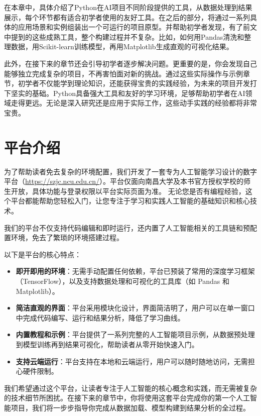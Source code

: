 在本章中，具体介绍了Python在AI项目不同阶段提供的工具，从数据处理到结果展示，每个环节都有适合初学者使用的友好工具。在之后的部分，将通过一系列具体的应用场景和实例组装出一个可运行的项目原型。并帮助初学者发现，有了前文中提到的这些成熟工具，整个构建过程并不复杂。比如，如何用Pandas清洗和整理数据，用Scikit-learn训练模型，再用Matplotlib生成直观的可视化结果。

此外，在接下来的章节还会引导初学者逐步解决问题。更重要的是，你会发现自己能够独立完成复杂的项目，不再害怕面对新的挑战。通过这些实际操作与示例章节，初学者不仅能学到理论知识，还能获得宝贵的实践经验，为未来的项目开发打下坚实的基础。Python具备强大工具和友好的学习环境，足够帮助初学者在AI领域走得更远。无论是深入研究还是应用于实际工作，这些动手实践的经验都将非常宝贵。

\section{平台介绍}
为了帮助读者免去复杂的环境配置，我们开发了一套专为人工智能学习设计的数字平台（\href{https://szjc.ncu.edu.cn/}{https://szjc.ncu.edu.cn/}）。平台仅面向南昌大学及本书官方授权学校的师生开放，具体功能与登录权限以平台实际页面为准。
无论您是否有编程经验，这个平台都能帮助您轻松入门，让您专注于学习和实践人工智能的基础知识和核心技术。

我们的平台不仅支持代码编辑和即时运行，还内置了人工智能相关的工具链和预配置环境，免去了繁琐的环境搭建过程。

以下是平台的核心特点：
\begin{itemize}
    \item \textbf{即开即用的环境}：无需手动配置任何依赖，平台已预装了常用的深度学习框架（TensorFlow），以及支持数据处理和可视化的工具库（如 Pandas 和 Matplotlib）。
    \item \textbf{简洁直观的界面}：平台采用模块化设计，界面简洁明了，用户可以在单一窗口中完成代码编写、运行和结果分析，降低了学习曲线。
    \item \textbf{内置教程和示例}：平台提供了一系列完整的人工智能项目示例，从数据预处理到模型训练再到结果可视化，帮助读者从零开始快速入门。
    \item \textbf{支持云端运行}：平台支持在本地和云端运行，用户可以随时随地访问，无需担心硬件限制。
\end{itemize}

我们希望通过这个平台，让读者专注于人工智能的核心概念和实践，而无需被复杂的技术细节所困扰。在接下来的章节中，你将使用这套平台完成你的第一个人工智能项目，我们将一步步指导你完成从数据加载、模型构建到结果分析的全过程。

